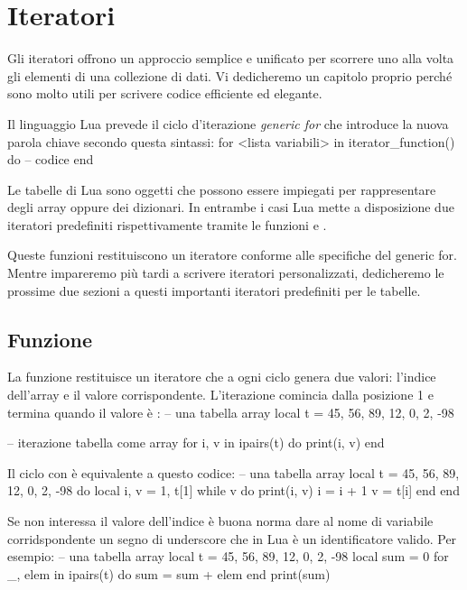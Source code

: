 
\chapter{Iteratori}

Gli iteratori offrono un approccio semplice e unificato per scorrere uno alla
volta gli elementi di una collezione di dati. Vi dedicheremo un capitolo proprio
perché sono molto utili per scrivere codice efficiente ed elegante.

Il linguaggio Lua prevede il ciclo d'iterazione \emph{generic for} che
introduce la nuova parola chiave  secondo questa sintassi:
\lines
for <lista variabili> in iterator_function() do
-- codice
end
\endlines
{}

Le tabelle di Lua sono oggetti che possono essere impiegati per rappresentare
degli array oppure dei dizionari. In entrambe i casi Lua mette a disposizione
due iteratori predefiniti rispettivamente tramite le funzioni  e
.

Queste funzioni restituiscono un iteratore conforme alle specifiche del generic
for. Mentre impareremo più tardi a scrivere iteratori personalizzati,
dedicheremo le prossime due sezioni a questi importanti iteratori predefiniti
per le tabelle.


\section{Funzione }

La funzione  restituisce un iteratore che a ogni ciclo genera due
valori: l'indice dell'array e il valore corrispondente. L'iterazione comincia
dalla posizione 1 e termina quando il valore è :
\lines
-- una tabella array
local t = {45, 56, 89, 12, 0, 2, -98}

-- iterazione tabella come array
for i, v in ipairs(t) do
    print(i, v)
end
\endlines
{}

Il ciclo con  è equivalente a questo codice:
\lines
-- una tabella array
local t = {45, 56, 89, 12, 0, 2, -98}
do
    local i, v = 1, t[1]
    while v do
        print(i, v)
        i = i + 1
        v = t[i]
    end
end
\endlines
{}

Se non interessa il valore dell'indice è buona norma dare al nome di variabile
corridspondente un segno di underscore \key{\_} che in Lua è un identificatore
valido. Per esempio:
\lines
-- una tabella array
local t = {45, 56, 89, 12, 0, 2, -98}
local sum = 0
for _, elem in ipairs(t) do
    sum = sum + elem
end
print(sum)
\endlines
{}

